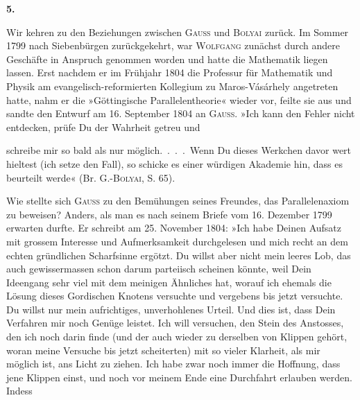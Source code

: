 \clearpage\begingroup{}
\begin{center}\textbf{5.}\par\smallskip
{}
\end{center}
\noindent\hspace*{\parindent}Wir kehren zu den Beziehungen zwischen \textsc{Gauss} und \textsc{Bolyai} zurück. Im
Sommer 1799 nach Siebenbürgen zurückgekehrt, war \textsc{Wolfgang} zunächst
durch andere Geschäfte in Anspruch genommen worden und hatte die Mathematik
liegen lassen. Erst nachdem er im Frühjahr 1804 die Professur für
Mathematik und Physik am evangelisch-reformierten Kollegium zu Maros-Vásárhely
angetreten hatte, nahm er die »Göttingische Parallelentheorie« wieder
vor, feilte sie aus und sandte den Entwurf am 16. September 1804 an \textsc{Gauss}.
»Ich kann den Fehler nicht entdecken, prüfe Du der Wahrheit getreu und
\par\vfill{}
\clearpage{}
\noindent schreibe mir so bald als nur möglich.\ .\ .\ .\ Wenn Du dieses Werkchen davor
wert hieltest (ich setze den Fall), so schicke es einer würdigen Akademie hin,
dass es beurteilt werde« (Br. G.-\textsc{Bolyai}, S. 65).
\par
Wie stellte sich \textsc{Gauss} zu den Bemühungen seines Freundes, das Parallelenaxiom
zu beweisen? Anders, als man es nach seinem Briefe vom 16. Dezember
1799 erwarten durfte. Er schreibt am 25. November 1804: »Ich habe
Deinen Aufsatz mit grossem Interesse und Aufmerksamkeit durchgelesen und
mich recht an dem echten gründlichen Scharfsinne ergötzt. Du willst aber
nicht mein leeres Lob, das auch gewissermassen schon darum parteiisch
scheinen könnte, weil Dein Ideengang sehr viel mit dem meinigen Ähnliches
hat, worauf ich ehemals die Lösung dieses Gordischen Knotens versuchte und
vergebens bis jetzt versuchte. Du willst nur mein aufrichtiges, unverhohlenes
Urteil. Und dies ist, dass Dein Verfahren mir noch  Genüge leistet.
Ich will versuchen, den Stein des Anstosses, den ich noch darin finde (und
der auch wieder zu derselben  von Klippen gehört, woran meine Versuche
bis jetzt scheiterten) mit so vieler Klarheit, als mir möglich ist, ans
Licht zu ziehen. Ich habe zwar noch immer die Hoffnung, dass jene Klippen
einst, und noch vor meinem Ende eine Durchfahrt erlauben werden. Indess
